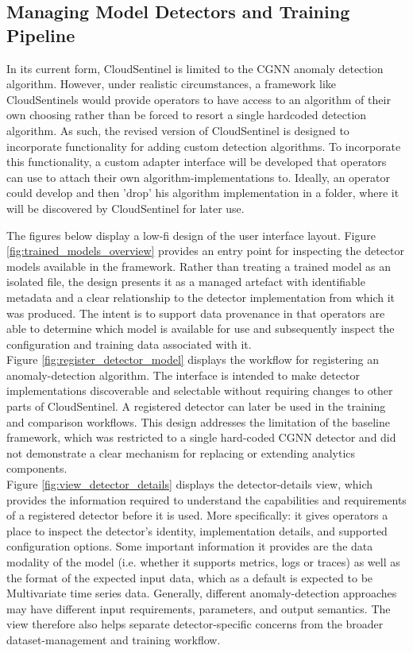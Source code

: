 \subsection{Managing Model Detectors and Training Pipeline}
In its current form, CloudSentinel is limited to the CGNN anomaly detection algorithm. However, under realistic circumstances, a framework like CloudSentinels would provide operators to have access to an algorithm of their own choosing rather than be forced to resort a single hardcoded detection algorithm. As such, the revised version of CloudSentinel is designed to incorporate functionality for adding custom detection algorithms. To incorporate this functionality, a custom adapter interface will be developed that operators can use to attach their own algorithm-implementations to. Ideally, an operator could develop and then 'drop' his algorithm implementation in a folder, where it will be discovered by CloudSentinel for later use.

The figures below display a low-fi design of the user interface layout. Figure \ref{fig:trained_models_overview} provides an entry point for inspecting the detector models available in the framework. Rather than treating a trained model as an isolated file, the design presents it as a managed artefact with identifiable metadata and a clear relationship to the detector implementation from which it was produced. The intent is to support data provenance in that operators are able to determine which model is available for use and subsequently inspect the configuration and training data associated with it.\\

Figure \ref{fig:register_detector_model} displays the workflow for registering an anomaly-detection algorithm. The interface is intended to make detector implementations discoverable and selectable without requiring changes to other parts of CloudSentinel. A registered detector can later be used in the training and comparison workflows. This design addresses the limitation of the baseline framework, which was restricted to a single hard-coded CGNN detector and did not demonstrate a clear mechanism for replacing or extending analytics components.\\

Figure \ref{fig:view_detector_details} displays the detector-details view, which provides the information required to understand the capabilities and requirements of a registered detector before it is used. More specifically: it gives operators a place to inspect the detector’s identity, implementation details, and supported configuration options. Some important information it provides are the data modality of the model (i.e. whether it supports metrics, logs or traces) as well as the  format of the expected input data, which as a default is expected to be Multivariate time series data. Generally, different anomaly-detection approaches may have different input requirements, parameters, and output semantics. The view therefore also helps separate detector-specific concerns from the broader dataset-management and training workflow.\\

